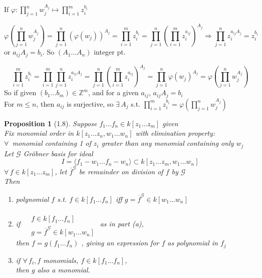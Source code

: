 \documentclass[10pt]{amsart}
\newtheorem{proposition}{Proposition}
\newcommand{\exercisehead}[1]
  { \smallskip
   \noindent{\small\bf Exercise #1.}
  }
\begin{document}
\begin{multicols*}{2}
If $\varphi: \prod_{j=1}^n w_j^{A_j} \mapsto \prod_{i=1}^m z_i^{b_i}$

\[
\varphi\left( \prod_{j=1}^n w_j^{A_j} \right) = \prod_{j=1}^n (\varphi(w_j))^{A_j} = \prod_{i=1}^m z_i^{b_i} = \prod_{j=1}^n \left( \prod_{i=1}^m z_i^{a_{ij}} \right)^{ A_j} \Longrightarrow \prod_{j=1}^n z_i^{a_{ij} A_j} = z_i^{b_i}
\]
or $a_{ij}A_j = b_i$.  So $(A_1\dots A_n)$ integer pt.  




\exercisehead{4} 
\[
\prod_{i=1}^m z_i^{b_i} = \prod_{i=1}^m \prod_{j=1}^n z_i^{ a_{ij} A_j } = \prod_{j=1}^n \left( \prod_{i=1}^m z_i^{a_{ij}} \right)^{A_j} = \prod_{j=1}^n \varphi(w_j)^{A_j} = \varphi\left( \prod_{j=1}^n w_j^{A_j} \right)
\]
So if given $(b_1 \dots b_m) \in \mathbb{Z}^m$, and for a given $a_{ij}$, $a_{ij}A_j = b_i$ \\

For $m\leq n$, then $a_{ij}$ is surjective, so $\exists \, A_j$ s.t. $\prod_{i=1}^m z_i^{b_i} = \varphi\left( \prod_{j=1}^n w_j^{A_j} \right)$



\begin{proposition}[1.8]
Suppose $f_1 \dots f_n \in k[z_1 \dots z_m]$ given \\
Fix monomial order in $k[z_1 \dots z_n, w_1 \dots w_n ]$ with elimination property: \\
$\forall \, $ monomial containing 1 of $z_i$ greater than any monomial containing only $w_j$ \\

Let $\mathcal{G}$ Gr\"{o}bner basis for ideal
\[
I = \langle f_1 - w_1 \dots f_n - w_n \rangle \subset k[z_1 \dots z_m, w_1 \dots w_n]
\]
$\forall \, f \in k[z_1 \dots z_m]$, let $\overline{f}^{ \mathcal{G}}$ be remainder on division of $f$ by $\mathcal{G}$ \\
Then
\begin{enumerate}
\item[(a)] polynomial $f$ s.t. $f\in k[f_1 \dots f_n]$ iff $g= \overline{f}^{ \mathcal{G}} \in k[w_1 \dots w_n]$
\item[(b)] if $\begin{aligned} & \quad \\
  & f \in k [f_1 \dots f_n ] \\
  & g = \overline{f}^{\mathcal{G}}\in k[ w_1 \dots w_n] \end{aligned}$ \quad as in part (a), \\

then $f = g(f_1 \dots f_n)$ , giving an expression for $f$ as polynomial in $f_j$
\item[(c)] if $\forall \, f_i, f$ monomials, $f\in k[f_1 \dots f_n]$, \\
then $g$ also a monomial.  
\end{enumerate}
\end{proposition}




\end{multicols*}
\end{document}

